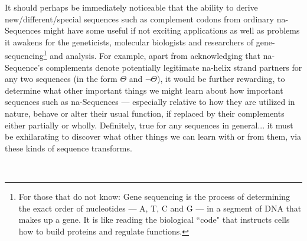 \documentclass[a4paper, 18pt]{book} %
\begin{document}
\vspace{1em}

It should perhaps be immediately noticeable that the ability to derive new/different/special sequences such as complement codons from ordinary na-Sequences might have some useful if not exciting applications as well as problems it awakens for the geneticists, molecular biologists and researchers of gene-sequencing\footnote{For those that do not know: Gene sequencing is the process of determining the exact order of nucleotides --- A, T, C and G --- in a segment of DNA that makes up a gene. It is like reading the biological ``code" that instructs cells how to build proteins and regulate functions\cite{copilot_dna_assistant}.} and analysis. For example, apart from acknowledging that na-Sequence's complements denote potentially legitimate na-helix strand partners for any two sequences (in the form $\Theta$ and $\lnot\Theta$), it would be further rewarding, to determine what other important things we might learn about how important sequences such as na-Sequences --- especially relative to how they are utilized in nature, behave or alter their usual function, if replaced by their complements either partially or wholly. Definitely, true for any sequences in general... it must be exhilarating to discover what other things we can learn with or from them, via these kinds of sequence transforms. 




\begin{center}
\\
\end{center}
\end{document}
